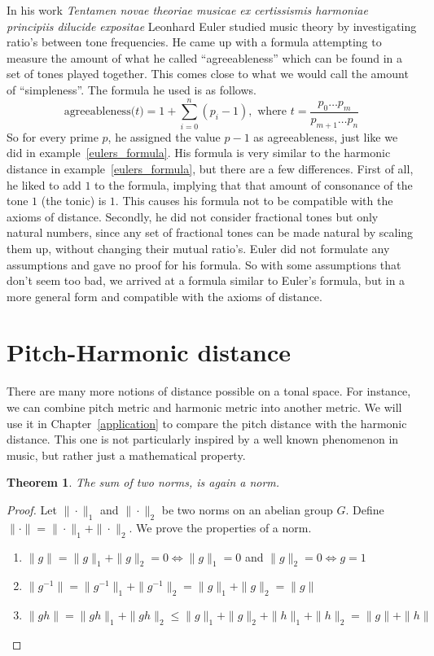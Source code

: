 \documentclass[a4paper]{book}
\newtheorem{theorem}{Theorem}[chapter]
\theoremstyle{definition}
\begin{document}
In his work \emph{Tentamen novae theoriae musicae ex certissismis harmoniae principiis dilucide expositae} Leonhard Euler studied music theory by investigating ratio's between tone frequencies.
He came up with a formula attempting to measure the amount of what he called ``agreeableness'' which can be found in a set of tones played together. \cite{Euler}
This comes close to what we would call the amount of ``simpleness''.
The formula he used is as follows.
\[ \mathrm{agreeableness(}t\mathrm{)} = 1 + \sum_{i = 0}^{n}{(p_i-1)},\text{\ where\ } t = \frac{p_0 \dots p_m}{p_{m+1} \dots p_n} \]
So for every prime $p$, he assigned the value $p-1$ as agreeableness, just like we did in example~\ref{eulers_formula}.
His formula is very similar to the harmonic distance in example~\ref{eulers_formula}, but there are a few differences.
First of all, he liked to add $1$ to the formula, implying that that amount of consonance of the tone $1$ (the tonic) is $1$.
This causes his formula not to be compatible with the axioms of distance.
Secondly, he did not consider fractional tones but only natural numbers, since any set of fractional tones can be made natural by scaling them up, without changing their mutual ratio's.
Euler did not formulate any assumptions and gave no proof for his formula.
So with some assumptions that don't seem too bad, we arrived at a formula similar to Euler's formula, but in a more general form and compatible with the axioms of distance.


\section{Pitch-Harmonic distance}
There are many more notions of distance possible on a tonal space.
For instance, we can combine pitch metric and harmonic metric into another metric.
We will use it in Chapter~\ref{application} to compare the pitch distance with the harmonic distance.
This one is not particularly inspired by a well known phenomenon in music, but rather just a mathematical property.

\begin{theorem}
    The sum of two norms, is again a norm.
    \label{sum_of_norms}
\end{theorem}
\begin{proof}
    Let $\|\cdot\|_1$ and $\|\cdot\|_2$ be two norms on an abelian group $G$.
    Define $\|\cdot\| = \|\cdot\|_1 + \|\cdot\|_2$.
    We prove the properties of a norm.
    \begin{enumerate}[i]
        \item $\|g\| = \|g\|_1 + \|g\|_2 = 0 \Leftrightarrow \|g\|_1 = 0 $ and $\|g\|_2 = 0 \Leftrightarrow g = 1$
        \item $\|g^{-1}\| = \|g^{-1}\|_1 + \|g^{-1}\|_2 = \|g\|_1 + \|g\|_2 = \|g\|$
        \item $\|gh\| = \|gh\|_1 + \|gh\|_2 \leq  \|g\|_1 + \|g\|_2 + \|h\|_1 + \|h\|_2 = \|g\| + \|h\|$
    \end{enumerate}
\end{proof}
\end{document}
